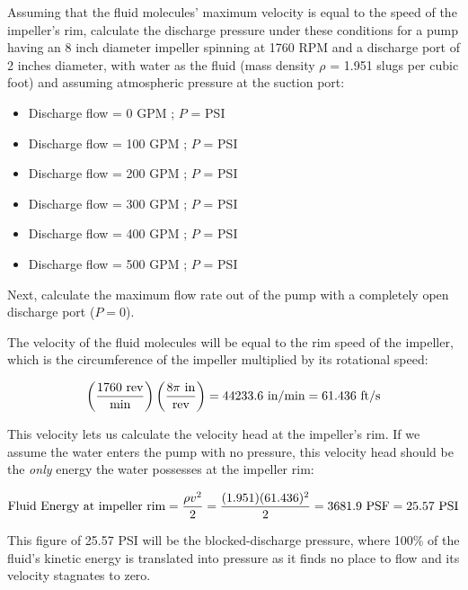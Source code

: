 Assuming that the fluid molecules' maximum velocity is equal to the speed of the impeller's rim, calculate the discharge pressure under these conditions for a pump having an 8 inch diameter impeller spinning at 1760 RPM and a discharge port of 2 inches diameter, with water as the fluid (mass density $\rho$ = 1.951 slugs per cubic foot) and assuming atmospheric pressure at the suction port:

\begin{itemize}
\item{} Discharge flow = 0 GPM ; $P$ = \underbar{\hskip 50pt} PSI
\vskip 5pt
\item{} Discharge flow = 100 GPM ; $P$ = \underbar{\hskip 50pt} PSI 
\vskip 5pt
\item{} Discharge flow = 200 GPM ; $P$ = \underbar{\hskip 50pt} PSI 
\vskip 5pt
\item{} Discharge flow = 300 GPM ; $P$ = \underbar{\hskip 50pt} PSI 
\vskip 5pt
\item{} Discharge flow = 400 GPM ; $P$ = \underbar{\hskip 50pt} PSI 
\vskip 5pt
\item{} Discharge flow = 500 GPM ; $P$ = \underbar{\hskip 50pt} PSI 
\end{itemize}

Next, calculate the maximum flow rate out of the pump with a completely open discharge port ($P = 0$).

\vskip 10pt








The velocity of the fluid molecules will be equal to the rim speed of the impeller, which is the circumference of the impeller multiplied by its rotational speed:

$$\left({1760 \hbox{ rev} \over \hbox{min}}\right) \left({8 \pi \hbox{ in} \over \hbox{rev}}\right) = 44233.6 \hbox{ in/min} = 61.436 \hbox{ ft/s}$$

This velocity lets us calculate the velocity head at the impeller's rim.  If we assume the water enters the pump with no pressure, this velocity head should be the {\it only} energy the water possesses at the impeller rim:

$$\hbox{Fluid Energy at impeller rim} = {\rho v^2 \over 2} = {(1.951)(61.436)^2 \over 2} = 3681.9 \hbox{ PSF} = 25.57 \hbox{ PSI}$$

This figure of 25.57 PSI will be the blocked-discharge pressure, where 100\% of the fluid's kinetic energy is translated into pressure as it finds no place to flow and its velocity stagnates to zero.

